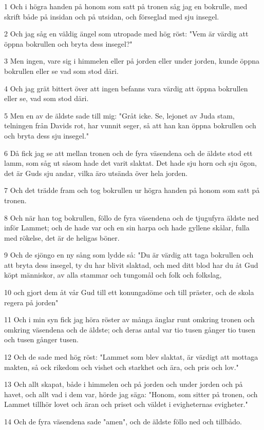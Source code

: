 \par 1 Och i högra handen på honom som satt på tronen såg jag en bokrulle, med skrift både på insidan och på utsidan, och förseglad med sju insegel.
\par 2 Och jag såg en väldig ängel som utropade med hög röst: "Vem är värdig att öppna bokrullen och bryta dess insegel?"
\par 3 Men ingen, vare sig i himmelen eller på jorden eller under jorden, kunde öppna bokrullen eller se vad som stod däri.
\par 4 Och jag grät bittert över att ingen befanns vara värdig att öppna bokrullen eller se, vad som stod däri.
\par 5 Men en av de äldste sade till mig: "Gråt icke. Se, lejonet av Juda stam, telningen från Davids rot, har vunnit seger, så att han kan öppna bokrullen och och bryta dess sju insegel."
\par 6 Då fick jag se att mellan tronen och de fyra väsendena och de äldste stod ett lamm, som såg ut såsom hade det varit slaktat. Det hade sju horn och sju ögon, det är Guds sju andar, vilka äro utsända över hela jorden.
\par 7 Och det trädde fram och tog bokrullen ur högra handen på honom som satt på tronen.
\par 8 Och när han tog bokrullen, föllo de fyra väsendena och de tjugufyra äldste ned inför Lammet; och de hade var och en sin harpa och hade gyllene skålar, fulla med rökelse, det är de heligas böner.
\par 9 Och de sjöngo en ny sång som lydde så: "Du är värdig att taga bokrullen och att bryta dess insegel, ty du har blivit slaktad, och med ditt blod har du åt Gud köpt människor, av alla stammar och tungomål och folk och folkslag,
\par 10 och gjort dem åt vår Gud till ett konungadöme och till präster, och de skola regera på jorden"
\par 11 Och i min syn fick jag höra röster av många änglar runt omkring tronen och omkring väsendena och de äldste; och deras antal var tio tusen gånger tio tusen och tusen gånger tusen.
\par 12 Och de sade med hög röst: "Lammet som blev slaktat, är värdigt att mottaga makten, så ock rikedom och vishet och starkhet och ära, och pris och lov."
\par 13 Och allt skapat, både i himmelen och på jorden och under jorden och på havet, och allt vad i dem var, hörde jag säga: "Honom, som sitter på tronen, och Lammet tillhör lovet och äran och priset och väldet i evigheternas evigheter."
\par 14 Och de fyra väsendena sade "amen", och de äldste föllo ned och tillbådo.

